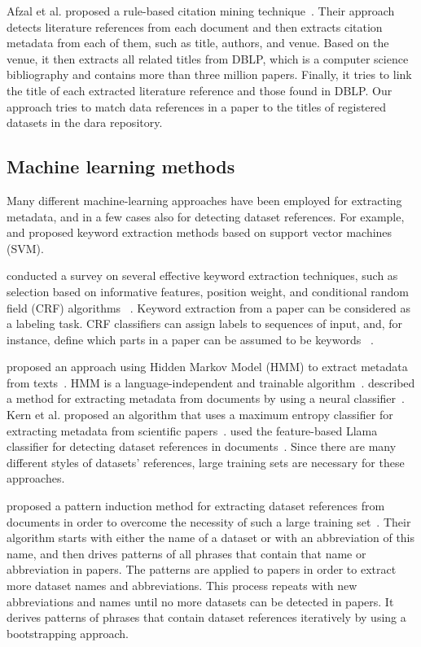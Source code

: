 \documentclass{IOS-Book-Article}
\newcommand{\dara}{\textsf{da\textbar ra}}
\begin{document}
Afzal et al. proposed a rule-based citation mining technique~\cite{Afzal2010}. Their approach detects literature references from each document and then extracts citation metadata from each of them, such as title, authors, and venue. Based on the venue, it then extracts all related titles from DBLP, which is a computer science bibliography and contains more than three million papers. Finally, it tries to link the title of each extracted literature reference and those found in DBLP. Our approach tries to match data references in a paper to the titles of registered datasets in the {\dara} repository.

\subsection{Machine learning methods}
Many different machine-learning approaches have been employed for extracting metadata, and in a few cases also for detecting dataset references. For example, \citeauthor{Zhang2006} \citeyearpar{Zhang2006} and \citeauthor{Han2003} \citeyearpar{Han2003} proposed keyword extraction methods based on support vector machines (SVM). 

\citeauthor{Kaur2010} conducted a survey on several effective keyword extraction techniques, such as selection based on informative features, position weight, and conditional random field (CRF) algorithms ~\citeyearpar{Kaur2010}. Keyword extraction from a paper can be considered as a labeling task. CRF classifiers can assign labels to sequences of input, and, for instance, define which parts in a paper can be assumed to be keywords ~\citep{ZHANG2008}.

\citeauthor{Cui2010} proposed an approach using Hidden Markov Model (HMM) to extract metadata from texts~\citeyearpar{Cui2010}. 
HMM is a language-independent and trainable algorithm~\cite{Kubala1998}. \citeauthor{Marinai2009} described a method for extracting metadata from documents by using a neural classifier~\citeyearpar{Marinai2009}. Kern et al. proposed an algorithm that uses a maximum entropy classifier for extracting metadata from scientific papers~\cite{Kern2012}.
\citeauthor{MeiyuLu2012} used the feature-based Llama classifier for detecting dataset references in documents~\citeyearpar{MeiyuLu2012}. Since there are many different styles of datasets' references, large training sets are necessary for these approaches.

\citeauthor{Boland2012} proposed a pattern induction method for extracting dataset references from documents in order to overcome the necessity of such a large training set~\citeyearpar{Boland2012}.
Their algorithm starts with either the name of a dataset or with an abbreviation of this name, and then drives patterns of all phrases that contain that name or abbreviation in papers. The patterns are applied to papers in order to extract more dataset names and abbreviations. This process repeats with new abbreviations and names until no more datasets can be detected in papers. It derives patterns of phrases that contain dataset references iteratively by using a bootstrapping approach.
\end{document}
